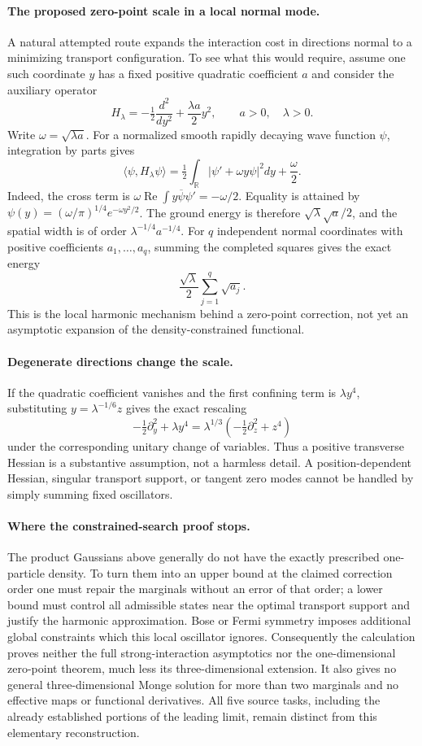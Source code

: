 \documentclass[11pt]{article}
\begin{document}
\paragraph{The proposed zero-point scale in a local normal mode.}
A natural attempted route expands the interaction cost in directions normal to a minimizing transport configuration. To see what this would require, assume one such coordinate $y$ has a fixed positive quadratic coefficient $a$ and consider the auxiliary operator
\[
 H_\lambda=-\tfrac12\frac{d^2}{dy^2}+\frac{\lambda a}{2}y^2,
 \qquad a>0,\quad\lambda>0.
\]
Write $\omega=\sqrt{\lambda a}$. For a normalized smooth rapidly decaying wave function $\psi$, integration by parts gives
\[
 \langle\psi,H_\lambda\psi\rangle
 =\tfrac12\int_{\mathbb R}|\psi'+\omega y\psi|^2dy
   +\frac\omega2.
\]
Indeed, the cross term is
$\omega\operatorname{Re}\int y\overline\psi\psi'=-\omega/2$.
Equality is attained by
$\psi(y)=(\omega/\pi)^{1/4}e^{-\omega y^2/2}$.
The ground energy is therefore $\sqrt\lambda\sqrt a/2$, and the spatial width is of order $\lambda^{-1/4}a^{-1/4}$.
For $q$ independent normal coordinates with positive coefficients $a_1,\ldots,a_q$, summing the completed squares gives the exact energy
\[
 \frac{\sqrt\lambda}{2}\sum_{j=1}^q\sqrt{a_j}.
\]
This is the local harmonic mechanism behind a zero-point correction, not yet an asymptotic expansion of the density-constrained functional.

\paragraph{Degenerate directions change the scale.}
If the quadratic coefficient vanishes and the first confining term is $\lambda y^4$, substituting $y=\lambda^{-1/6}z$ gives the exact rescaling
\[
 -\tfrac12\partial_y^2+\lambda y^4
 =\lambda^{1/3}\left(-\tfrac12\partial_z^2+z^4\right)
\]
under the corresponding unitary change of variables. Thus a positive transverse Hessian is a substantive assumption, not a harmless detail. A position-dependent Hessian, singular transport support, or tangent zero modes cannot be handled by simply summing fixed oscillators.

\paragraph{Where the constrained-search proof stops.}
The product Gaussians above generally do not have the exactly prescribed one-particle density. To turn them into an upper bound at the claimed correction order one must repair the marginals without an error of that order; a lower bound must control all admissible states near the optimal transport support and justify the harmonic approximation. Bose or Fermi symmetry imposes additional global constraints which this local oscillator ignores. Consequently the calculation proves neither the full strong-interaction asymptotics nor the one-dimensional zero-point theorem, much less its three-dimensional extension. It also gives no general three-dimensional Monge solution for more than two marginals and no effective maps or functional derivatives. All five source tasks, including the already established portions of the leading limit, remain distinct from this elementary reconstruction.
\end{document}
